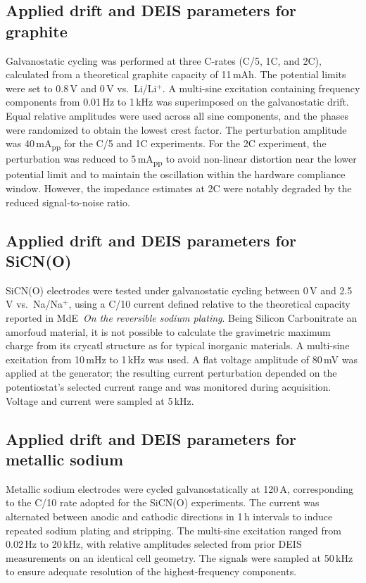 \subsection{Applied drift and DEIS parameters for graphite}
Galvanostatic cycling was performed at three C-rates (C/5, 1C, and 2C), calculated from a theoretical graphite capacity of 11\,mAh.  
The potential limits were set to 0.8\,V and 0\,V vs.\ Li/Li$^+$.  
A multi-sine excitation containing frequency components from 0.01\,Hz to 1\,kHz was superimposed on the galvanostatic drift.  
Equal relative amplitudes were used across all sine components, and the phases were randomized to obtain the lowest crest factor.  
The perturbation amplitude was 40\,mA\textsubscript{pp} for the C/5 and 1C experiments.  
For the 2C experiment, the perturbation was reduced to 5\,mA\textsubscript{pp} to avoid non-linear distortion near the lower potential limit and to maintain the oscillation within the hardware compliance window.  
However, the impedance estimates at 2C were notably degraded by the reduced signal-to-noise ratio.

\subsection{Applied drift and DEIS parameters for SiCN(O)}
SiCN(O) electrodes were tested under galvanostatic cycling between 0\,V and 2.5\,V vs.\ Na/Na$^+$, using a C/10 current defined relative to the theoretical capacity reported in MdE~\textit{On the reversible sodium plating}.
Being Silicon Carbonitrate an amorfoud material, it is not possible to calculate the gravimetric maximum charge from its crycatl structure as for typical inorganic materials.
A multi-sine excitation from 10\,mHz to 1\,kHz was used. 
A flat voltage amplitude of 80\,mV was applied at the generator; the resulting current perturbation depended on the potentiostat's selected current range and was monitored during acquisition.  
Voltage and current were sampled at 5\,kHz.

\subsection{Applied drift and DEIS parameters for metallic sodium}
Metallic sodium electrodes were cycled galvanostatically at 120\,\textmu A, corresponding to the C/10 rate adopted for the SiCN(O) experiments.  
The current was alternated between anodic and cathodic directions in 1\,h intervals to induce repeated sodium plating and stripping.  
The multi-sine excitation ranged from 0.02\,Hz to 20\,kHz, with relative amplitudes selected from prior DEIS measurements on an identical cell geometry.  
The signals were sampled at 50\,kHz to ensure adequate resolution of the highest-frequency components.

